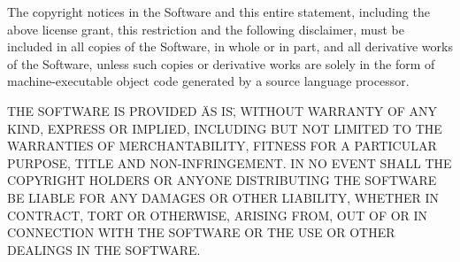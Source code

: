 \documentclass{scrartcl}
\begin{document}
\begin{appendix}
The copyright notices in the Software and this entire statement, including
the above license grant, this restriction and the following disclaimer,
must be included in all copies of the Software, in whole or in part, and
all derivative works of the Software, unless such copies or derivative
works are solely in the form of machine-executable object code generated by
a source language processor.\newline\newline

THE SOFTWARE IS PROVIDED \"AS IS\", WITHOUT WARRANTY OF ANY KIND, EXPRESS OR
IMPLIED, INCLUDING BUT NOT LIMITED TO THE WARRANTIES OF MERCHANTABILITY,
FITNESS FOR A PARTICULAR PURPOSE, TITLE AND NON-INFRINGEMENT. IN NO EVENT
SHALL THE COPYRIGHT HOLDERS OR ANYONE DISTRIBUTING THE SOFTWARE BE LIABLE
FOR ANY DAMAGES OR OTHER LIABILITY, WHETHER IN CONTRACT, TORT OR OTHERWISE,
ARISING FROM, OUT OF OR IN CONNECTION WITH THE SOFTWARE OR THE USE OR OTHER
DEALINGS IN THE SOFTWARE.
\end{appendix}
\end{document}
